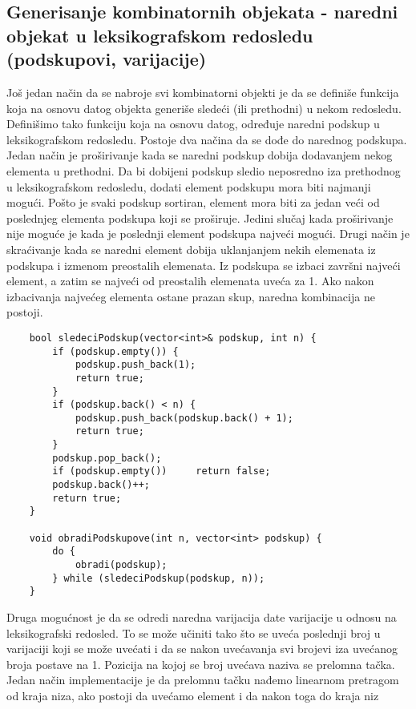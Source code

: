 \documentclass{article}
\begin{document}
\subsection{Generisanje kombinatornih objekata - naredni objekat u leksikografskom redosledu (podskupovi, varijacije)}
Još jedan način da se nabroje svi kombinatorni objekti je da se definiše funkcija
koja na osnovu datog objekta generiše sledeći (ili prethodni) u nekom
redosledu. Definišimo tako funkciju koja na osnovu
datog, određuje naredni podskup u leksikografskom redosledu. Postoje dva načina da se dođe do narednog podskupa. Jedan način je proširivanje kada se naredni podskup dobija dodavanjem nekog
elementa u prethodni. Da bi dobijeni podskup sledio neposredno iza
prethodnog u leksikografskom redosledu, dodati element podskupu mora biti
najmanji mogući. Pošto je svaki podskup sortiran, element mora biti za jedan
veći od poslednjeg elementa podskupa koji se proširuje. Jedini slučaj kada proširivanje nije moguće je
kada je poslednji element podskupa najveći mogući. Drugi način je skraćivanje kada se naredni element dobija uklanjanjem nekih
elemenata iz podskupa i izmenom preostalih elemenata. Iz podskupa se izbaci završni najveći element, a
zatim se najveći od preostalih elemenata uveća za 1. Ako nakon izbacivanja
najvećeg elementa ostane prazan skup, naredna kombinacija ne postoji.
\begin{lstlisting}
    bool sledeciPodskup(vector<int>& podskup, int n) {
        if (podskup.empty()) {
            podskup.push_back(1);
            return true;
        }
        if (podskup.back() < n) {
            podskup.push_back(podskup.back() + 1);
            return true;
        }
        podskup.pop_back();
        if (podskup.empty())     return false;
        podskup.back()++;
        return true;
    }
    
    void obradiPodskupove(int n, vector<int> podskup) {
        do {
            obradi(podskup);
        } while (sledeciPodskup(podskup, n));
    }
\end{lstlisting} \vspace{0.2cm}
Druga mogućnost je da se odredi naredna varijacija date varijacije u odnosu na
leksikografski redosled. To se može učiniti tako što se uveća poslednji broj u
varijaciji koji se može uvećati i da se nakon uvećavanja svi brojevi iza uvećanog
broja postave na 1. Pozicija na kojoj se broj uvećava naziva se prelomna tačka. Jedan način implementacije je da prelomnu tačku nađemo linearnom pretragom
od kraja niza, ako postoji da uvećamo element i da nakon toga do kraja niz
\end{document}
